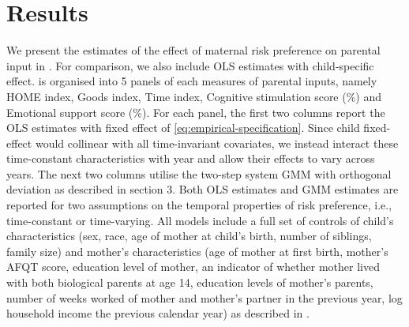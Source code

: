 \documentclass[emulatestandardclasses, 10pt, abstract = true]{scrartcl}
\begin{document}
\section{Results}
We present the estimates of the effect of maternal risk preference on parental input in . For comparison, we also include OLS estimates with child-specific effect.  is organised into 5 panels of each measures of parental inputs, namely HOME index, Goods index, Time index, Cognitive stimulation score (\%) and Emotional support score (\%). For each panel, the first two columns report the OLS estimates with fixed effect of \eqref{eq:empirical-specification}. Since child fixed-effect would collinear with all time-invariant covariates, we instead interact these time-constant characteristics with year and allow their effects to vary across years. The next two columns utilise the two-step system GMM with orthogonal deviation as described in section 3. Both OLS estimates and GMM estimates are reported for two assumptions on the temporal properties of risk preference, i.e., time-constant or time-varying. All models include a full set of controls of child's characteristics (sex, race, age of mother at child's birth, number of siblings, family size) and mother's characteristics (age of mother at first birth, mother's AFQT score, education level of mother, an indicator of whether mother lived with both biological parents at age 14, education levels of mother's parents, number of weeks worked of mother and mother's partner in the previous year, log household income the previous calendar year) as described in .  
\end{document}

